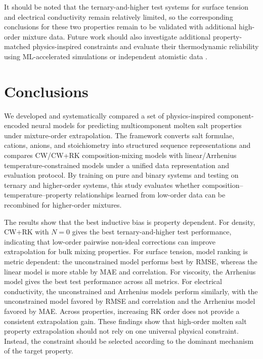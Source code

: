 \documentclass[journal=jctcce,manuscript=article,doi=true]{achemso}
\begin{document}
It should be noted that the ternary-and-higher test systems for surface tension and electrical conductivity remain relatively limited, so the corresponding conclusions for these two properties remain to be validated with additional high-order mixture data. Future work should also investigate additional property-matched physics-inspired constraints and evaluate their thermodynamic reliability using ML-accelerated simulations or independent atomistic data \cite{gibson2025computing}.

\section{Conclusions}\label{sec:conclusions}

We developed and systematically compared a set of physics-inspired component-encoded neural models for predicting multicomponent molten salt properties under mixture-order extrapolation. The framework converts salt formulae, cations, anions, and stoichiometry into structured sequence representations and compares CW/CW+RK composition-mixing models with linear/Arrhenius temperature-constrained models under a unified data representation and evaluation protocol. By training on pure and binary systems and testing on ternary and higher-order systems, this study evaluates whether composition--temperature--property relationships learned from low-order data can be recombined for higher-order mixtures.

The results show that the best inductive bias is property dependent. For density, CW+RK with \(N=0\) gives the best ternary-and-higher test performance, indicating that low-order pairwise non-ideal corrections can improve extrapolation for bulk mixing properties. For surface tension, model ranking is metric dependent: the unconstrained model performs best by RMSE, whereas the linear model is more stable by MAE and correlation. For viscosity, the Arrhenius model gives the best test performance across all metrics. For electrical conductivity, the unconstrained and Arrhenius models perform similarly, with the unconstrained model favored by RMSE and correlation and the Arrhenius model favored by MAE. Across properties, increasing RK order does not provide a consistent extrapolation gain. These findings show that high-order molten salt property extrapolation should not rely on one universal physical constraint. Instead, the constraint should be selected according to the dominant mechanism of the target property.
\end{document}

